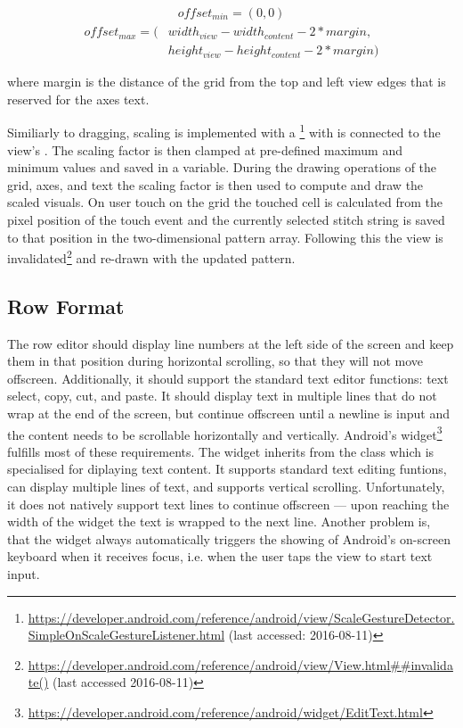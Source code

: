 \begin{gather*}
offset_{min} = (0, 0)
\end{gather*}
\begin{align*}
offset_{max} = (&width_{view} - width_{content} - 2 * margin, \\
				&height_{view} - height_{content} - 2 * margin)
\end{align*}

where margin is the distance of the grid from the top and left view edges that is reserved for the axes text.

Similiarly to dragging, scaling is implemented with a \footnote{\url{https://developer.android.com/reference/android/view/ScaleGestureDetector.SimpleOnScaleGestureListener.html} (last accessed: 2016-08-11)} with is connected to the view's . The scaling factor is then clamped at pre-defined maximum and minimum values and saved in a variable. During the drawing operations of the grid, axes, and text the scaling factor is then used to compute and draw the scaled visuals. On user touch on the grid the touched cell is calculated from the pixel position of the touch event and the currently selected stitch string is saved to that position in the two-dimensional pattern array. Following this the view is invalidated\footnote{\url{https://developer.android.com/reference/android/view/View.html##invalidate()} (last accessed 2016-08-11)} and re-drawn with the updated pattern.   

\subsection{Row Format}
\label{impl_row_format}
The row editor should display line numbers at the left side of the screen and keep them in that position during horizontal scrolling, so that they will not move offscreen. Additionally, it should support the standard text editor functions: text select, copy, cut, and paste. It should display text in multiple lines that do not wrap at the end of the screen, but continue offscreen until a newline is input and the content needs to be scrollable horizontally and vertically. Android's  widget\footnote{\url{https://developer.android.com/reference/android/widget/EditText.html}} fulfills most of these requirements. The  widget inherits from the class  which is specialised for diplaying text content. It supports standard text editing funtions, can display multiple lines of text, and supports vertical scrolling. Unfortunately, it does not natively support text lines to continue offscreen --- upon reaching the width of the widget the text is wrapped to the next line. Another problem is, that the widget always automatically triggers the showing of Android's on-screen keyboard when it receives focus, i.e. when the user taps the view to start text input. 

